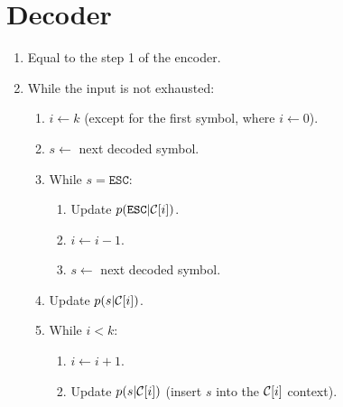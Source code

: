 \section{Decoder}
\begin{enumerate}
\item Equal to the step 1 of the encoder.
\item While the input is not exhausted:
  \begin{enumerate}
  \item $i\leftarrow k$ (except for the first symbol, where
    $i\leftarrow 0$).
  \item $s\leftarrow$ next decoded symbol.
  \item While $s=\mathtt{ESC}$:
    \begin{enumerate}
      \item Update $p(\mathtt{ESC}|{\cal C}[i])$.
      \item $i\leftarrow i-1$.
      \item $s\leftarrow$ next decoded symbol.
    \end{enumerate}
  \item Update $p(s|{\cal C}[i])$.
  \item While $i<k$:
    \begin{enumerate}
    \item $i\leftarrow i+1$.
    \item Update $p(s|{\cal C}[i])$ (insert $s$ into the ${\cal C}[i]$
      context).
    \end{enumerate}
  \end{enumerate}
\end{enumerate}

